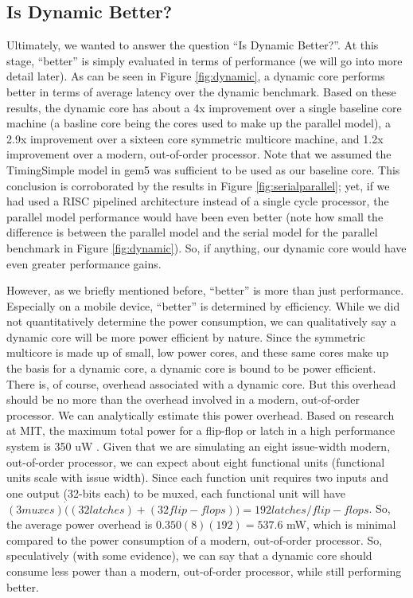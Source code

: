 \subsection{Is Dynamic Better?}
Ultimately, we wanted to answer the question ``Is Dynamic Better?''. At this stage, ``better'' is simply evaluated in terms of performance (we will go into more detail later). As can be seen in Figure \ref{fig:dynamic}, a dynamic core performs better in terms of average latency over the dynamic benchmark. Based on these results, the dynamic core has about a 4x improvement over a single baseline core machine (a basline core being the cores used to make up the parallel model), a 2.9x improvement over a sixteen core symmetric multicore machine, and 1.2x improvement over a modern, out-of-order processor. Note that we assumed the TimingSimple model in gem5 was sufficient to be used as our baseline core. This conclusion is corroborated by the results in Figure \ref{fig:serialparallel}; yet, if we had used a RISC pipelined architecture instead of a single cycle processor, the parallel model performance would have been even better (note how small the difference is between the parallel model and the serial model for the parallel benchmark in Figure \ref{fig:dynamic}). So, if anything, our dynamic core would have even greater performance gains.

However, as we briefly mentioned before, ``better'' is more than just performance. Especially on a mobile device, ``better'' is determined by efficiency. While we did not quantitatively determine the power consumption, we can qualitatively say a dynamic core will be more power efficient by nature. Since the symmetric multicore is made up of small, low power cores, and these same cores make up the basis for a dynamic core, a dynamic core is bound to be power efficient. There is, of course, overhead associated with a dynamic core. But this overhead should be no more than the overhead involved in a modern, out-of-order processor. We can analytically estimate this power overhead. Based on research at MIT, the maximum total power for a flip-flop or latch in a high performance system is 350 uW \cite{power}. Given that we are simulating an eight issue-width modern, out-of-order processor, we can expect about eight functional units (functional units scale with issue width). Since each function unit requires two inputs and one output (32-bits each) to be muxed, each functional unit will have $(3 muxes) \dot ((32 latches) + (32 flip-flops)) = 192 latches/flip-flops$. So, the average power overhead is $0.350(8)(192) = 537.6$ mW, which is minimal compared to the power consumption of a modern, out-of-order processor. So, speculatively (with some evidence), we can say that a dynamic core should consume less power than a modern, out-of-order processor, while still performing better.

